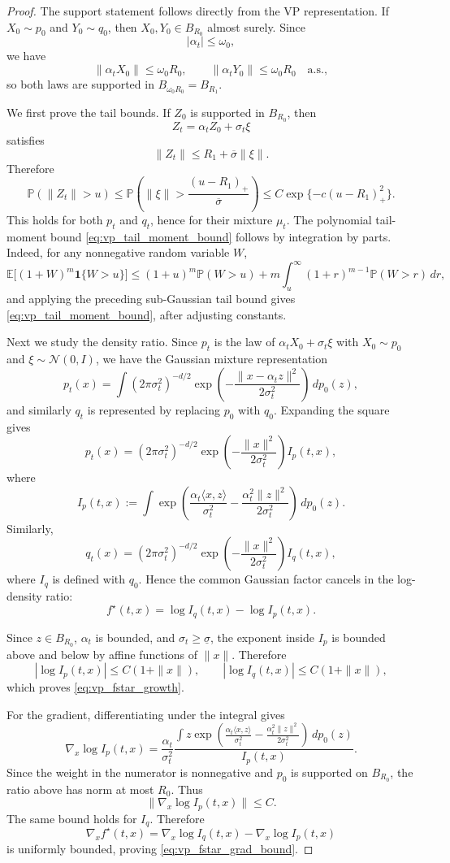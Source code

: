 \documentclass[11pt]{article}
\theoremstyle{plain}
\theoremstyle{definition}
\theoremstyle{remark}
\begin{document}
\begin{proof}
The support statement follows directly from the VP representation. If
\(X_0\sim p_0\) and \(Y_0\sim q_0\), then
\(X_0,Y_0\in B_{R_0}\) almost surely. Since
\[
|\alpha_t|\le \omega_0,
\]
we have
\[
\|\alpha_tX_0\|\le \omega_0R_0,
\qquad
\|\alpha_tY_0\|\le \omega_0R_0
\quad\text{a.s.},
\]
so both laws are supported in
$
B_{\omega_0R_0}
=
B_{R_1}.
$

We first prove the tail bounds. If \(Z_0\) is supported in
\(B_{R_0}\), then
\[
Z_t=\alpha_tZ_0+\sigma_t\xi
\]
satisfies
\[
\|Z_t\|
\le
R_1+\overline\sigma\|\xi\|.
\]
Therefore
\[
\mathbb P(\|Z_t\|>u)
\le
\mathbb P\left(
\|\xi\|>\frac{(u-R_1)_+}{\overline\sigma}
\right)
\le
C\exp\{-c(u-R_1)_+^2\}.
\]
This holds for both \(p_t\) and \(q_t\), hence for their mixture \(\mu_t\).
The polynomial tail-moment bound
\eqref{eq:vp_tail_moment_bound} follows by integration by parts. Indeed, for
any nonnegative random variable \(W\),
\[
\mathbb E\big[(1+W)^m\mathbf 1\{W>u\}\big]
\le
(1+u)^m\mathbb P(W>u)
+
 m\int_u^\infty (1+r)^{m-1}\mathbb P(W>r)\,dr,
\]
and applying the preceding sub-Gaussian tail bound gives
\eqref{eq:vp_tail_moment_bound}, after adjusting constants.

Next we study the density ratio. Since \(p_t\) is
the law of \(\alpha_tX_0+\sigma_t\xi\) with \(X_0\sim p_0\) and
\(\xi\sim\mathcal N(0,I)\), we have the Gaussian mixture representation
\[
p_t(x)
=
\int
(2\pi\sigma_t^2)^{-d/2}
\exp\left(
-\frac{\|x-\alpha_t z\|^2}{2\sigma_t^2}
\right)
\,dp_0(z),
\]
and similarly \(q_t\) is represented by replacing \(p_0\) with \(q_0\).
Expanding the square gives
\[
p_t(x)
=
(2\pi\sigma_t^2)^{-d/2}
\exp\left(-\frac{\|x\|^2}{2\sigma_t^2}\right)
I_p(t,x),
\]
where
\[
I_p(t,x):=
\int
\exp\left(
\frac{\alpha_t\langle x,z\rangle}{\sigma_t^2}
-
\frac{\alpha_t^2\|z\|^2}{2\sigma_t^2}
\right)\,dp_0(z).
\]
Similarly,
\[
q_t(x)
=
(2\pi\sigma_t^2)^{-d/2}
\exp\left(-\frac{\|x\|^2}{2\sigma_t^2}\right)
I_q(t,x),
\]
where \(I_q\) is defined with \(q_0\). Hence the common Gaussian factor
cancels in the log-density ratio:
\[
f^\star(t,x)
=
\log I_q(t,x)-\log I_p(t,x).
\]

Since \(z\in B_{R_0}\), \(\alpha_t\) is bounded, and
\(\sigma_t\ge\underline\sigma\), the exponent inside \(I_p\) is bounded above
and below by affine functions of \(\|x\|\). Therefore
\[
|\log I_p(t,x)|\le C(1+\|x\|),
\qquad
|\log I_q(t,x)|\le C(1+\|x\|),
\]
which proves \eqref{eq:vp_fstar_growth}.

For the gradient, differentiating under the integral gives
\[
\nabla_x\log I_p(t,x)
=
\frac{\alpha_t}{\sigma_t^2}
\frac{
\int
z
\exp\left(
\frac{\alpha_t\langle x,z\rangle}{\sigma_t^2}
-
\frac{\alpha_t^2\|z\|^2}{2\sigma_t^2}
\right)\,dp_0(z)
}{
I_p(t,x)
}.
\]
Since the weight in the numerator is nonnegative and \(p_0\) is supported on
\(B_{R_0}\), the ratio above has norm at most \(R_0\). Thus
\[
\|\nabla_x\log I_p(t,x)\|\le C.
\]
The same bound holds for \(I_q\). Therefore
\[
\nabla_x f^\star(t,x)
=
\nabla_x\log I_q(t,x)-\nabla_x\log I_p(t,x)
\]
is uniformly bounded, proving \eqref{eq:vp_fstar_grad_bound}.


\end{proof}
\end{document}
